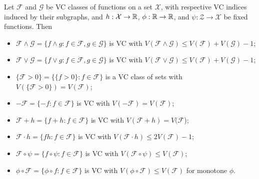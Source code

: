 \documentclass[12pt, a3paper, openany]{book}
\begin{document}
\begin{Lemma}
Let $\mathcal{F}$ and $\mathcal{G}$ be VC classes of functions on a set $\mathcal{X}$, with respective VC indices induced by their subgraphs, and $h : \mathcal{X} \to \mathbb{R}$, $\phi : \mathbb{R} \to \mathbb{R}$, and
$\psi : \mathcal{Z} \to \mathcal{X}$ be fixed functions. Then
\begin{itemize}
\setlength{\itemsep}{0pt}
\item $\mathcal{F} \wedge \mathcal{G} = \{ f \wedge g : f \in \mathcal{F}, g \in \mathcal{G} \}$ is VC with $V(\mathcal{F} \wedge \mathcal{G}) \leq V(\mathcal{F}) + V(\mathcal{G}) - 1$;
\item $\mathcal{F} \vee \mathcal{G} = \{ f \vee g : f \in \mathcal{F}, g \in \mathcal{G} \}$ is VC with $V(\mathcal{F} \vee \mathcal{G}) \leq V(\mathcal{F}) + V(\mathcal{G}) - 1$;
\item $\{\mathcal{F} > 0\} = \{ \{f > 0\} : f \in \mathcal{F} \}$ is a VC class of sets with $V(\{\mathcal{F} > 0\}) = V(\mathcal{F})$;
\item $-\mathcal{F} = \{-f:f\in\mathcal{F}\}$ is VC with $V(-\mathcal{F}) = V(\mathcal{F})$;
\item $\mathcal{F} + h = \{ f + h : f \in \mathcal{F} \}$ is VC with $V(\mathcal{F}+h) = V(\mathcal{F}$);
\item $\mathcal{F} \cdot h = \{ fh : f \in \mathcal{F} \}$ is VC with $V(\mathcal{F} \cdot h) \leq 2V(\mathcal{F}) - 1$;
\item $\mathcal{F} \circ \psi = \{ f\circ\psi : f \in \mathcal{F} \}$ is VC with $V(\mathcal{F} \circ \psi) \leq V(\mathcal{F})$;
\item $\phi \circ \mathcal{F} = \{ \phi \circ f : f \in \mathcal{F} \}$ is VC with $V(\phi\circ\mathcal{F}) \leq V(\mathcal{F})$ for monotone $\phi$.
\end{itemize}
\end{Lemma}
\end{document}
